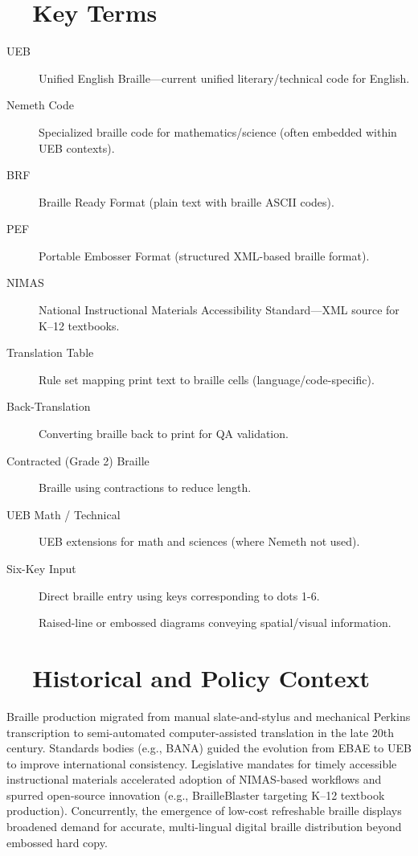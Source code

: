\section{~~Key Terms}
\label{sec:braille-key-terms}
\begin{description}
	\item[UEB]  Unified English Braille—current unified literary/technical code for English.
	\item[Nemeth Code]  Specialized braille code for mathematics/science (often embedded within UEB contexts).
	\item[BRF]  Braille Ready Format (plain text with braille ASCII codes).
	\item[PEF]  Portable Embosser Format (structured XML-based braille format).
	\item[NIMAS]  National Instructional Materials Accessibility Standard—XML source for K–12 textbooks.
	\item[Translation Table]  Rule set mapping print text to braille cells (language/code-specific).
	\item[Back-Translation]  Converting braille back to print for QA validation.
	\item[Contracted (Grade 2) Braille]  Braille using contractions to reduce length.
	\item[UEB Math / Technical]  UEB extensions for math and sciences (where Nemeth not used).
	\item[Six-Key Input]  Direct braille entry using keys corresponding to dots 1-6.
	\item[]  Raised-line or embossed diagrams conveying spatial/visual information.
\end{description}

\section{~~Historical and Policy Context}
\label{sec:braille-history}
Braille production migrated from manual slate-and-stylus and mechanical Perkins transcription to semi-automated computer-assisted translation in the late 20th century. Standards bodies (e.g., BANA) guided the evolution from EBAE to UEB to improve international consistency. Legislative mandates for timely accessible instructional materials accelerated adoption of NIMAS-based workflows and spurred open-source innovation (e.g., BrailleBlaster targeting K–12 textbook production). Concurrently, the emergence of low-cost refreshable braille displays broadened demand for accurate, multi-lingual digital braille distribution beyond embossed hard copy.

